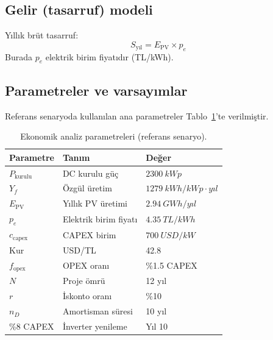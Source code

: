 \documentclass[12pt,a4paper]{article}
\begin{document}
\subsection{Gelir (tasarruf) modeli}
Yıllık brüt tasarruf:
\begin{equation}
S_{\text{yıl}} = E_{\text{PV}} \times p_e
\end{equation}
Burada $p_e$ elektrik birim fiyatıdır (TL/kWh).

\subsection{Parametreler ve varsayımlar}
Referans senaryoda kullanılan ana parametreler Tablo~\ref{tab:eco_params}'te verilmiştir.

\begin{table}[H]
\centering
\caption{Ekonomik analiz parametreleri (referans senaryo).}
\label{tab:eco_params}
\begin{tabular}{p{5cm} p{5cm} p{4cm}}
\toprule
Parametre & Tanım & Değer \\
\midrule
$P_{\text{kurulu}}$ & DC kurulu güç & $\SI{2300}{kWp}$ \\
$Y_f$ & Özgül üretim & $\SI{1279}{kWh/kWp\cdot yıl}$ \\
$E_{\text{PV}}$ & Yıllık PV üretimi & $\SI{2.94}{GWh/yıl}$ \\
$p_e$ & Elektrik birim fiyatı & $\SI{4.35}{TL/kWh}$ \\
$c_{\text{capex}}$ & CAPEX birim & $\SI{700}{USD/kW}$ \\
Kur & USD/TL & 42.8 \\
$f_{\text{opex}}$ & OPEX oranı & \%1.5 CAPEX \\
$N$ & Proje ömrü & 12 yıl \\
$r$ & İskonto oranı & \%10 \\
$n_D$ & Amortisman süresi & 10 yıl \\
\%8 CAPEX & İnverter yenileme & Yıl 10 \\
\bottomrule
\end{tabular}
\end{table}
\end{document}
